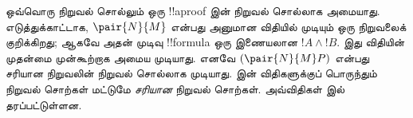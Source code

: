\documentclass[../../../include/open-logic-section]{subfiles}
\begin{document}
ஒவ்வொரு நிறுவல் சொல்லும் ஒரு !!a{proof} இன்
நிறுவல் சொல்லாக அமையாது. எடுத்துக்காட்டாக,
$\pair{N}{M}$ என்பது \Intro{\land} அனுமான விதியில்
முடியும் ஒரு நிறுவலைக் குறிக்கிறது; ஆகவே அதன் முடிவு
!!{formula} ஒரு இணையலான $!A \land !B$. இது
\Elim{\lif} விதியின் முதன்மை முன்கூற்றாக அமைய
முடியாது. எனவே $(\pair{N}{M}P)$ என்பது சரியான
நிறுவலின் நிறுவல் சொல்லாக முடியாது.
 இன் விதிகளுக்குப் பொருந்தும் நிறுவல்
சொற்கள் மட்டுமே \emph{சரியான} நிறுவல் சொற்கள்.
அவ்விதிகள்  இல் தரப்பட்டுள்ளன.


\end{document}
